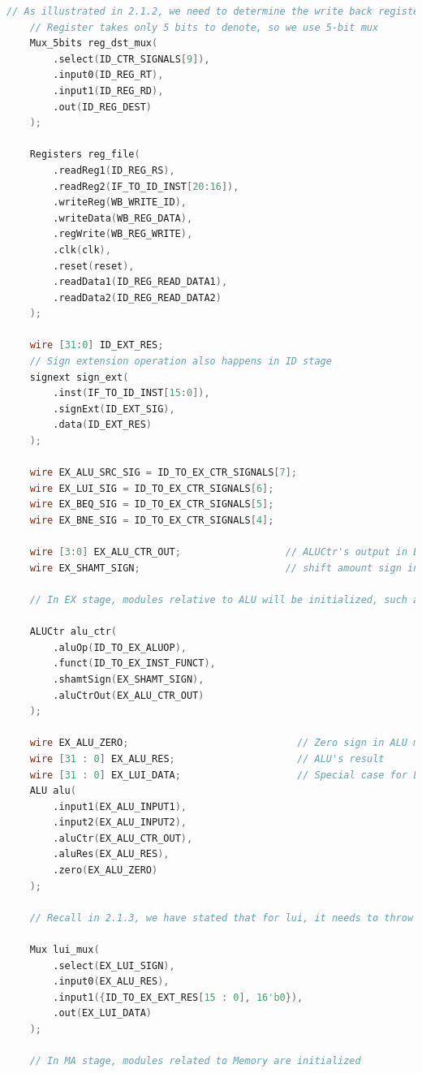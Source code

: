 \begin{lstlisting}[language=Verilog]
    // As illustrated in 2.1.2, we need to determine the write back register in ID stage
    // Register takes only 5 bits to denote, so we use 5-bit mux
    Mux_5bits reg_dst_mux(
        .select(ID_CTR_SIGNALS[9]),
        .input0(ID_REG_RT),
        .input1(ID_REG_RD),
        .out(ID_REG_DEST)
    );

    Registers reg_file(
        .readReg1(ID_REG_RS),
        .readReg2(IF_TO_ID_INST[20:16]),
        .writeReg(WB_WRITE_ID),
        .writeData(WB_REG_DATA),
        .regWrite(WB_REG_WRITE),
        .clk(clk),
        .reset(reset),
        .readData1(ID_REG_READ_DATA1),
        .readData2(ID_REG_READ_DATA2)
    );
    
    wire [31:0] ID_EXT_RES;
    // Sign extension operation also happens in ID stage
    signext sign_ext(
        .inst(IF_TO_ID_INST[15:0]),
        .signExt(ID_EXT_SIG),
        .data(ID_EXT_RES)
    );

    wire EX_ALU_SRC_SIG = ID_TO_EX_CTR_SIGNALS[7];
    wire EX_LUI_SIG = ID_TO_EX_CTR_SIGNALS[6];
    wire EX_BEQ_SIG = ID_TO_EX_CTR_SIGNALS[5];
    wire EX_BNE_SIG = ID_TO_EX_CTR_SIGNALS[4];

    wire [3:0] EX_ALU_CTR_OUT;                  // ALUCtr's output in EX stage
    wire EX_SHAMT_SIGN;                         // shift amount sign in EX stage

    // In EX stage, modules relative to ALU will be initialized, such as ALUCtr, ALU

    ALUCtr alu_ctr(
        .aluOp(ID_TO_EX_ALUOP),
        .funct(ID_TO_EX_INST_FUNCT),
        .shamtSign(EX_SHAMT_SIGN),
        .aluCtrOut(EX_ALU_CTR_OUT)
    );

    wire EX_ALU_ZERO;                             // Zero sign in ALU module
    wire [31 : 0] EX_ALU_RES;                     // ALU's result
    wire [31 : 0] EX_LUI_DATA;                    // Special case for LUI instruction
    ALU alu(
        .input1(EX_ALU_INPUT1),
        .input2(EX_ALU_INPUT2),
        .aluCtr(EX_ALU_CTR_OUT),
        .aluRes(EX_ALU_RES),
        .zero(EX_ALU_ZERO)
    );

    // Recall in 2.1.3, we have stated that for lui, it needs to throw the output of ALU

    Mux lui_mux(
        .select(EX_LUI_SIGN),
        .input0(EX_ALU_RES),
        .input1({ID_TO_EX_EXT_RES[15 : 0], 16'b0}),
        .out(EX_LUI_DATA)
    );

    // In MA stage, modules related to Memory are initialized


\end{lstlisting}
